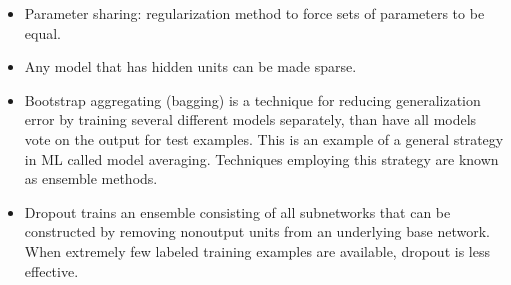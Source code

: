 \documentclass{article}
\begin{document}
\begin{itemize}
\item Parameter sharing: regularization method to force sets of parameters to be equal.
\item Any model that has hidden units can be made sparse.
\item Bootstrap aggregating (bagging) is a technique for reducing generalization error by training several different models separately, than have all models vote on the output for test examples. This is an example of a general strategy in ML called model averaging. Techniques employing this strategy are known as ensemble methods.
\item Dropout trains an ensemble consisting of all subnetworks that can be constructed by removing nonoutput units from an underlying base network. When extremely few labeled training examples are available, dropout is less effective.
\end{itemize}
\end{document}
